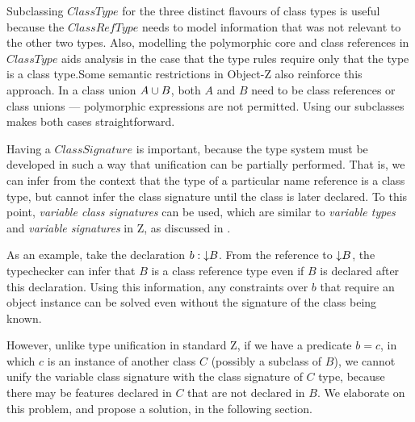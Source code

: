 Subclassing $ClassType$ for the three distinct flavours of class types
is useful because the $ClassRefType$ needs to model information that
was not relevant to the other two types. Also, modelling the
polymorphic core and class references in $ClassType$ aids analysis in
the case that the type rules require only that the type is a class
type.Some semantic restrictions in Object-Z also reinforce this
approach. In a class union $A \classuni B$, both $A$ and $B$ need to
be class references or class unions --- polymorphic expressions are
not permitted. Using our subclasses makes both cases straightforward.

Having a $ClassSignature$ is important, because the type system must
be developed in such a way that unification can be partially
performed. That is, we can infer from the context that the type of a
particular name reference is a class type, but cannot infer the class
signature until the class is later declared.  To this point, {\em
variable class signatures} can be used, which are similar to {\em
variable types} and {\em variable signatures} in Z, as discussed in
\cite{toyn00}. 

As an example, take the declaration $b : \mathord\downarrow B$. From the reference
to $\mathord\downarrow B$, the typechecker can infer that $B$ is a class reference
type even if $B$ is declared after this declaration. Using this
information, any constraints over $b$ that require an object instance
can be solved even without the signature of the class being known.

However, unlike type unification in standard Z, if we have
a predicate $b = c$, in which $c$ is an instance of another class $C$
(possibly a subclass of $B$), we cannot unify the
variable class signature with the class signature of $C$ type, because
there may be features declared in $C$ that are not declared in
$B$. We elaborate on this problem, and propose a solution, 
in the following section.
